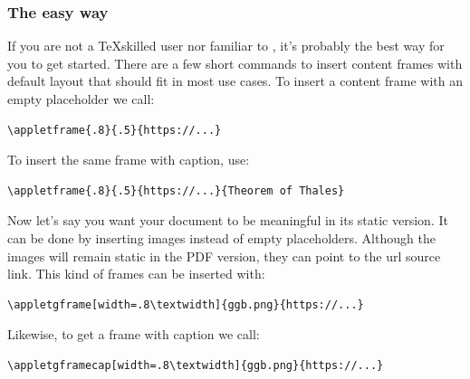 \documentclass[10pt,a4paper]{article}
\begin{document}
\subsubsection{The easy way}
If you are not a \TeX skilled user nor familiar to \intex, it's probably the best way for you to get started. There are a few short commands to insert content frames with default layout that should fit in most use cases.
\clearpage
To insert a content frame with an empty placeholder we call: 
\begin{lstlisting}[frame=single]
\appletframe{.8}{.5}{https://...}
\end{lstlisting}
To insert the same frame with caption, use:
\begin{lstlisting}[frame=single]
\appletframe{.8}{.5}{https://...}{Theorem of Thales}
\end{lstlisting}
\clearpage
Now let's say you want your document to be meaningful in its static version. It can be done by inserting images instead of empty placeholders. Although the images will remain static in the PDF version, they can point to the url source link. This kind of frames can be inserted with:
\begin{lstlisting}[frame=single]
\appletgframe[width=.8\textwidth]{ggb.png}{https://...}
\end{lstlisting}
Likewise, to get a frame with caption we call:
\begin{lstlisting}[frame=single]
\appletgframecap[width=.8\textwidth]{ggb.png}{https://...}
\end{lstlisting}
\end{document}
